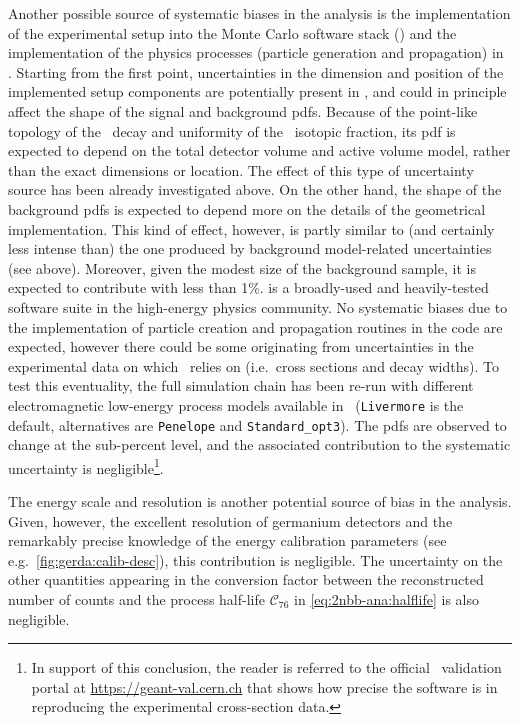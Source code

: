\begin{description}[wide]
  \item[\mage\ and \geant{}] Another possible source of systematic biases in the analysis
    is the implementation of the experimental setup into the Monte Carlo software stack
    (\mage) and the implementation of the physics processes (particle generation and
    propagation) in \geant. Starting from the first point, uncertainties in the dimension
    and position of the implemented setup components are potentially present in \mage, and
    could in principle affect the shape of the signal and background pdfs. Because of the
    point-like topology of the \nnbb\ decay and uniformity of the \gesix\ isotopic
    fraction, its pdf is expected to depend on the total detector volume and active volume
    model, rather than the exact dimensions or location. The effect of this type of
    uncertainty source has been already investigated above. On the other hand, the shape
    of the background pdfs is expected to depend more on the details of the geometrical
    implementation. This kind of effect, however, is partly similar to (and certainly less
    intense than) the one produced by background model-related uncertainties (see above).
    Moreover, given the modest size of the background sample, it is expected to contribute
    with less than 1\%.
    \newpar
    \geant{} is a broadly-used and heavily-tested software suite in the high-energy
    physics community. No systematic biases due to the implementation of particle creation
    and propagation routines in the code are expected, however there could be some
    originating from uncertainties in the experimental data on which \geant\ relies on
    (i.e.~cross sections and decay widths). To test this eventuality, the full simulation
    chain has been re-run with different electromagnetic low-energy process models
    available in \geant\ (\texttt{Livermore} is the default, alternatives are
    \texttt{Penelope} and \texttt{Standard\_opt3}). The pdfs are observed to change at the
    sub-percent level, and the associated contribution to the systematic uncertainty is
    negligible\footnote{%
      In support of this conclusion, the reader is referred to the official \geant\
      validation portal at \url{https://geant-val.cern.ch} that shows how precise the
      software is in reproducing the experimental cross-section data. 
    }.

  \item[Other sources] The energy scale and resolution is another potential source of
    bias in the analysis. Given, however, the excellent resolution of germanium detectors
    and the remarkably precise knowledge of the energy calibration parameters (see
    e.g.~\cref{fig:gerda:calib-desc}), this contribution is negligible. The uncertainty on
    the other quantities appearing in the conversion factor between the reconstructed
    number of counts and the process half-life $\mathcal{C}_{76}$ in
    \cref{eq:2nbb-ana:halflife} is also negligible.

\end{description}

